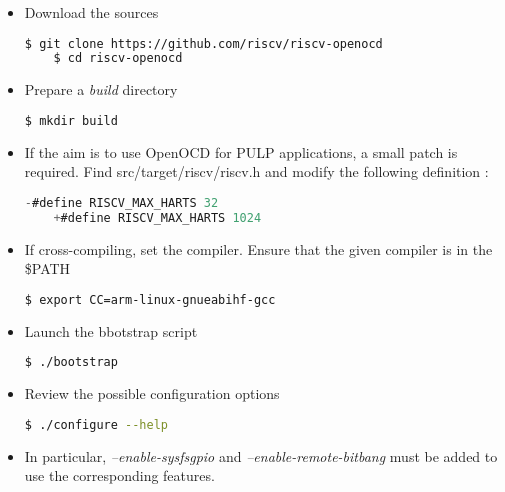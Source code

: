 \documentclass{article}
\begin{document}
    \begin{itemize}
    
    \item Download the sources
    
    \begin{lstlisting}[language=bash]
    $ git clone https://github.com/riscv/riscv-openocd
    $ cd riscv-openocd
    \end{lstlisting}
    
    \item Prepare a \textit{build} directory
    
    \begin{lstlisting}[language=bash]
    $ mkdir build
    \end{lstlisting}
    
    \item If the aim is to use OpenOCD for PULP applications, a small patch is required. Find src/target/riscv/riscv.h and modify the following definition :
    
    \begin{lstlisting}[language=C]
    -#define RISCV_MAX_HARTS 32
    +#define RISCV_MAX_HARTS 1024
    \end{lstlisting}
    
    \item If cross-compiling, set the compiler. Ensure that the given compiler is in the \$PATH
    	
    \begin{lstlisting}[language=bash]
    $ export CC=arm-linux-gnueabihf-gcc
    \end{lstlisting}
    
    \item Launch the bbotstrap script
    	
    \begin{lstlisting}[language=bash]
    $ ./bootstrap
    \end{lstlisting}
    
    \item Review the possible configuration options
    	
    \begin{lstlisting}[language=bash]
    $ ./configure --help
    \end{lstlisting}
    
    \item In particular, \textit{--enable-sysfsgpio} and \textit{--enable-remote-bitbang} must be added to use the corresponding features.
    

\end{itemize}
\end{document}
